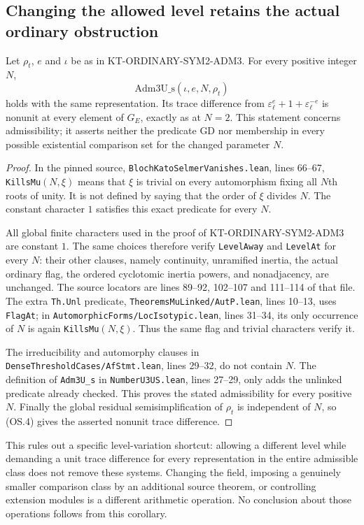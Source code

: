 \subsection{Changing the allowed level retains the actual ordinary obstruction}

\begin{corollary}
Let $\rho_t$, $e$ and $\iota$ be as in
KT-ORDINARY-SYM2-ADM3. For every positive integer $N$,
\[
                  \mathrm{Adm3U\_s}(\iota,e,N,\rho_t)
\]
holds with the same representation. Its trace difference from
$\varepsilon_\ell^e+1+\varepsilon_\ell^{-e}$ is nonunit
at every element of $G_E$, exactly as at $N=2$.
This statement concerns admissibility; it asserts neither
the predicate GD nor membership in every possible existential
comparison set for the changed parameter $N$.
\end{corollary}
\begin{proof}
In the pinned source,
\texttt{BlochKatoSelmerVanishes.lean}, lines 66--67,
\texttt{KillsMu}$(N,\xi)$ means that $\xi$ is trivial on
every automorphism fixing all $N$th roots of unity. It is
not defined by saying that the order of $\xi$ divides $N$.
The constant character $1$ satisfies this exact predicate
for every $N$.

All global finite characters used in the proof of
KT-ORDINARY-SYM2-ADM3 are constant $1$. The same choices
therefore verify \texttt{LevelAway} and \texttt{LevelAt}
for every $N$: their other clauses, namely continuity,
unramified inertia, the actual ordinary flag, the ordered
cyclotomic inertia powers, and nonadjacency, are unchanged.
The source locators are lines 89--92, 102--107 and
111--114 of that file. The extra \texttt{Th.Unl}
predicate, \texttt{TheoremsMuLinked/AutP.lean}, lines
10--13, uses \texttt{FlagAt}; in
\texttt{AutomorphicForms/LocIsotypic.lean}, lines 31--34,
its only occurrence of $N$ is again \texttt{KillsMu}$(N,\xi)$.
Thus the same flag and trivial characters verify it.

The irreducibility and automorphy clauses in
\texttt{DenseThresholdCases/AfStmt.lean}, lines 29--32,
do not contain $N$. The definition of \texttt{Adm3U\_s}
in \texttt{NumberU3US.lean}, lines 27--29, only adds the
unlinked predicate already checked. This proves the stated
admissibility for every positive $N$. Finally the global
residual semisimplification of $\rho_t$ is independent
of $N$, so (OS.4) gives the asserted nonunit trace difference.
\end{proof}

This rules out a specific level-variation shortcut: allowing
a different level while demanding a unit trace difference
for every representation in the entire admissible class
does not remove these systems. Changing the field, imposing
a genuinely smaller comparison class by an additional
source theorem, or controlling extension modules is a
different arithmetic operation. No conclusion about those
operations follows from this corollary.

